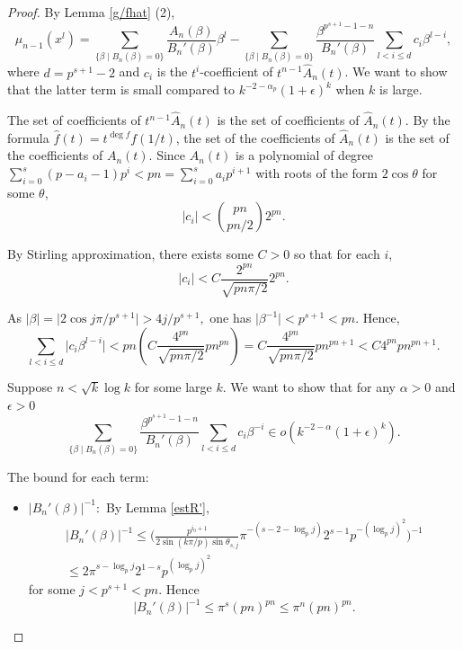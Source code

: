 \documentclass[11 pt]{amsart}
\theoremstyle{plain}
\theoremstyle{definition}
\theoremstyle{remark}
\def\b{\beta}
\def\m{\mu}
\begin{document}
\begin{proof}
    By Lemma \ref{g/fhat} (2), $$\m_{n-1}(x^l)=\sum_{\{\b \mid B_n(\b)=0\}}\frac{A_n(\b)}{B_n'(\b)}\b^l -\sum_{\{\b \mid B_n(\b)=0\}} \frac{\b^{p^{s+1}-1-n}}{B_n'(\b)}\sum_{{l<i \le d}} c_i \b^{l-i},$$ where $d=p^{s+1}-2$ and $c_i$ is the $t^i$-coefficient of $t^{n-1}\widehat{A}_n(t)$.  We want to show that the latter term is small compared to $k^{-2-\alpha_p}(1+\epsilon)^k$ when $k$ is large. 
    
    The set of  coefficients of $t^{n-1}\widehat{A}_n(t)$ is the set of  coefficients of $\widehat{A}_n(t)$. By the formula $\hat{f}(t)=t^{\deg f}f(1/t)$, the set of the coefficients of $\widehat{A}_n(t)$ is the set of the coefficients of $A_n(t)$. Since $A_n(t)$ is a polynomial of degree $\sum_{i=0}^s (p-a_i-1)p^{i}<pn=\sum_{i=0}^s a_i p^{i+1}$ with roots of the form $2 \cos \theta$ for some $\theta$, $$\vert c_i \vert < \binom{pn}{pn/2} 2^{pn}.$$

    By Stirling approximation, there exists some $C>0$ so that for each $i$, $$\vert c_i \vert < C \frac{2^{pn}}{\sqrt{pn\pi/2}}2^{pn}.$$
    
    As $\vert \b \vert =\vert 2 \cos j\pi/p^{s+1}\vert > 4j/p^{s+1},$ one has $\vert \b ^{-1} \vert < p^{s+1}<pn.$ Hence, $$\sum_{{l<i \le d}} \vert c_i \b^{l-i} \vert <  pn (C \frac{4^{pn}}{\sqrt{pn\pi/2}} pn^{pn})=C \frac{4^{pn}}{\sqrt{pn\pi/2}} pn^{pn+1}<C4^{pn}pn^{pn+1}.$$

    Suppose $n< \sqrt{k}\log k $ for some large $k$. We want to show that for any $\alpha>0$ and $\epsilon>0$  \begin{equation} \label{todiscard}
        \sum_{\{\b \mid B_n(\b)=0\}} \frac{\b^{p^{s+1}-1-n}}{B_n'(\b)}\sum_{{l<i \le d}} c_i \b^{-i} \in o(k^{-2-\alpha}(1+\epsilon)^k).
    \end{equation}

    The bound for each term:

    \begin{itemize}
        \item $\vert B_n'(\b) \vert^{-1}:$ By Lemma \ref{estR'}, \begin{align*}
            \vert B_n'(\b) \vert^{-1} \le \bigg(\frac{p^{i_0+1}}{2\sin(k\pi/p)\sin \theta_{s, j}}\pi^{-(s-2-\log_pj )}2^{s-1} p^{-(\log_p j)^2} \bigg)^{-1}\\
            \le 2\pi^{s-\log_p j}2^{1-s}p^{(\log_p j)^2}
        \end{align*}
        for some $j<p^{s+1}<pn.$ Hence $$\vert B_n'(\b) \vert^{-1} \le \pi^s (pn)^{pn} \le \pi^n(pn)^{pn}.$$


\end{itemize}
\end{proof}
\end{document}

